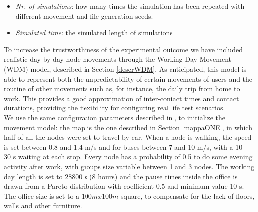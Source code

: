 \begin{itemize}
\item \textit{Nr. of simulations}: how many times the simulation has been repeated with different movement and file generation seeds.

\item \textit{Simulated time}: the simulated length of simulations

\end{itemize}

To increase the trustworthiness of the experimental outcome we have included realistic day-by-day node movements through the Working Day Movement (WDM) model, described in Section \ref{descrWDM}. As anticipated, this model is able to represent both the unpredictability of certain movements of users and the routine of other movements such as, for instance, the daily trip from home to work. This provides a good approximation of inter-contact times and contact durations, providing the flexibility for configuring real life test scenarios.
\\

We use the same configuration parameters described in \cite{articoloWdm}, to initialize the movement model: the map is the one described in Section \ref{mappaONE}, in which half of all the nodes were set to travel by car. When a node is walking, the speed is set between 0.8 and 1.4 m/s and for buses between 7 and 10 m/s, with a 10 - 30 s waiting at each stop. Every node has a probability of 0.5 to do some evening activity after work, with groups size variable between 1 and 3 nodes. The working day length is set to 28800 s (8 hours) and the pause times inside the office is drawn from a Pareto distribution with coefficient 0.5 and minimum value 10 s. The
office size is set to a $100 m x 100 m$ square, to compensate for the lack of floors, walls and other furniture.



\newpage
